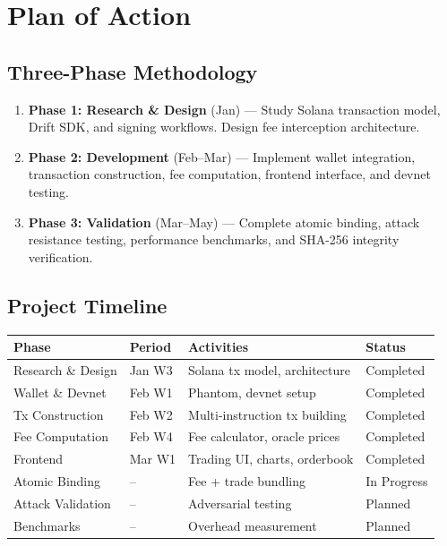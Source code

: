 \documentclass[12pt,a4paper]{article}
\begin{document}
\section{Plan of Action}

\subsection{Three-Phase Methodology}

\begin{enumerate}
    \item \textbf{Phase 1: Research \& Design} (Jan) --- Study Solana transaction model, Drift SDK, and signing workflows. Design fee interception architecture.
    \item \textbf{Phase 2: Development} (Feb--Mar) --- Implement wallet integration, transaction construction, fee computation, frontend interface, and devnet testing.
    \item \textbf{Phase 3: Validation} (Mar--May) --- Complete atomic binding, attack resistance testing, performance benchmarks, and SHA-256 integrity verification.
\end{enumerate}

\subsection{Project Timeline}

\begin{center}
\begin{tabular}{l l l l}
\toprule
\textbf{Phase} & \textbf{Period} & \textbf{Activities} & \textbf{Status} \\
\midrule
Research \& Design & Jan W3 & Solana tx model, architecture & Completed \\
Wallet \& Devnet & Feb W1 & Phantom, devnet setup & Completed \\
Tx Construction & Feb W2 & Multi-instruction tx building & Completed \\
Fee Computation & Feb W4 & Fee calculator, oracle prices & Completed \\
Frontend & Mar W1 & Trading UI, charts, orderbook & Completed \\
Atomic Binding & -- & Fee + trade bundling & In Progress \\
Attack Validation & -- & Adversarial testing & Planned \\
Benchmarks & -- & Overhead measurement & Planned \\
\bottomrule
\end{tabular}
\end{center}
\end{document}
